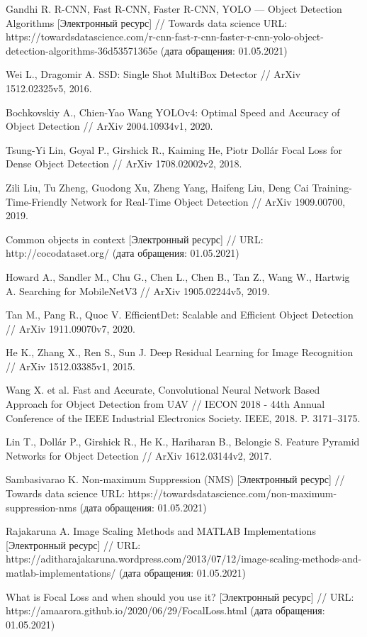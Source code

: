 \begin{thebibliography}{00}
    Gandhi R.
    R-CNN, Fast R-CNN, Faster R-CNN, YOLO — Object Detection Algorithms
    [Электронный ресурс] //
    Towards data science
    URL: https://towardsdatascience.com/r-cnn-fast-r-cnn-faster-r-cnn-yolo-object-detection-algorithms-36d53571365e
    (дата обращения: 01.05.2021)

    Wei L., Dragomir A.
    SSD: Single Shot MultiBox Detector //
    ArXiv 1512.02325v5, 2016.

    Bochkovskiy A., Chien-Yao Wang
    YOLOv4: Optimal Speed and Accuracy of Object Detection //
    ArXiv 2004.10934v1, 2020.

    Tsung-Yi Lin, Goyal P., Girshick R., Kaiming He, Piotr Dollár
    Focal Loss for Dense Object Detection //
    ArXiv 1708.02002v2, 2018.

    Zili Liu, Tu Zheng, Guodong Xu, Zheng Yang, Haifeng Liu, Deng Cai
    Training-Time-Friendly Network for Real-Time Object Detection //
    ArXiv 1909.00700, 2019.

    Common objects in context
    [Электронный ресурс] //
    URL: http://cocodataset.org/
    (дата обращения: 01.05.2021)

    Howard A., Sandler M., Chu G., Chen L., Chen B., Tan Z., Wang W., Hartwig A.
    Searching for MobileNetV3 //
    ArXiv 1905.02244v5, 2019.

    Tan M., Pang R., Quoc V.
    EfficientDet: Scalable and Efficient Object Detection //
    ArXiv 1911.09070v7, 2020.

    He K., Zhang X., Ren S., Sun J.
    Deep Residual Learning for Image Recognition //
    ArXiv 1512.03385v1, 2015.

    Wang X. et al.
    Fast and Accurate, Convolutional Neural Network Based Approach for Object Detection from UAV //
    IECON 2018 - 44th Annual Conference of the IEEE Industrial Electronics Society. IEEE, 2018. P. 3171–3175.

    Lin T., Dollár P., Girshick R., He K., Hariharan B., Belongie S.
    Feature Pyramid Networks for Object Detection //
    ArXiv 1612.03144v2, 2017.

    Sambasivarao K.
    Non-maximum Suppression (NMS)
    [Электронный ресурс] //
    Towards data science
    URL: https://towardsdatascience.com/non-maximum-suppression-nms
    (дата обращения: 01.05.2021)

    Rajakaruna A.
    Image Scaling Methods and MATLAB Implementations
    [Электронный ресурс] //
    URL: https://aditharajakaruna.wordpress.com/2013/07/12/image-scaling-methods-and-matlab-implementations/
    (дата обращения: 01.05.2021)

    What is Focal Loss and when should you use it?
    [Электронный ресурс] //
    URL: https://amaarora.github.io/2020/06/29/FocalLoss.html
    (дата обращения: 01.05.2021)

\end{thebibliography}
\endgroup

\clearpage